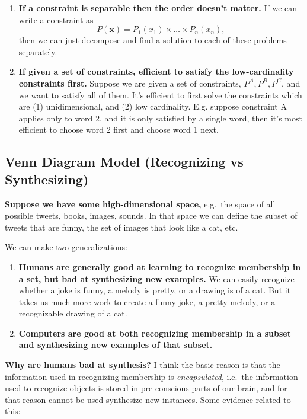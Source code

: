 \documentclass[
  11pt,
  letterpaper,
  DIV=11,
  numbers=noendperiod,
  oneside]{scrartcl}
\begin{document}
\begin{enumerate}
\def\labelenumi{\arabic{enumi}.}
\item
  \textbf{If a constraint is separable then the order doesn't matter.}
  If we can write a constraint as
  \[P(\bm{x})=P_1(x_1)\times\ldots\times P_n(x_n),\] then we can just
  decompose and find a solution to each of these problems separately.
\item
  \textbf{If given a set of constraints, efficient to satisfy the
  low-cardinality constraints first.} Suppose we are given a set of
  constraints, \(P^A,P^B,P^C\), and we want to satisfy all of them. It's
  efficient to first solve the constraints which are (1) unidimensional,
  and (2) low cardinality. E.g. suppose constraint A applies only to
  word 2, and it is only satisfied by a single word, then it's most
  efficient to choose word 2 first and choose word 1 next.
\end{enumerate}

\hypertarget{venn-diagram-model-recognizing-vs-synthesizing}{%
\subsection{Venn Diagram Model (Recognizing vs
Synthesizing)}\label{venn-diagram-model-recognizing-vs-synthesizing}}

\textbf{Suppose we have some high-dimensional space,} e.g.~the space of
all possible tweets, books, images, sounds. In that space we can define
the subset of tweets that are funny, the set of images that look like a
cat, etc.

We can make two generalizations:

\begin{enumerate}
\def\labelenumi{\arabic{enumi}.}
\item
  \textbf{Humans are generally good at learning to recognize membership
  in a set, but bad at synthesizing new examples.} We can easily
  recognize whether a joke is funny, a melody is pretty, or a drawing is
  of a cat. But it takes us much more work to create a funny joke, a
  pretty melody, or a recognizable drawing of a cat.
\item
  \textbf{Computers are good at both recognizing membership in a subset
  and synthesizing new examples of that subset.}
\end{enumerate}

\textbf{Why are humans bad at synthesis?} I think the basic reason is
that the information used in recognizing membership is
\emph{encapsulated}, i.e.~the information used to recognize objects is
stored in pre-conscious parts of our brain, and for that reason cannot
be used synthesize new instances. Some evidence related to this:
\end{document}
